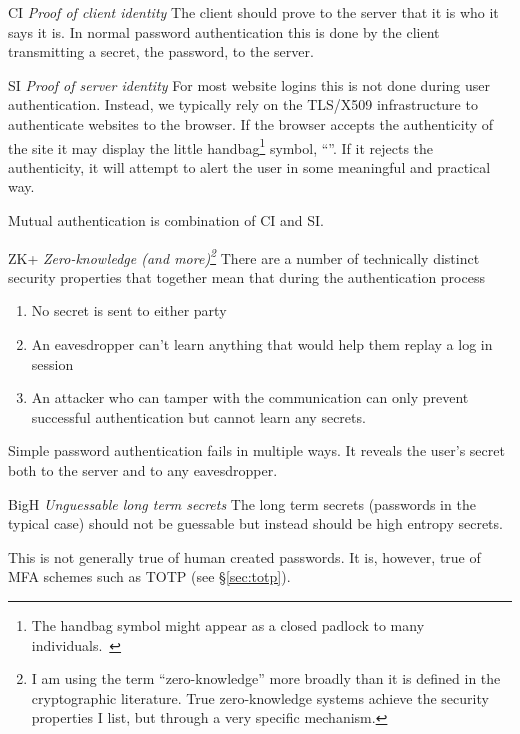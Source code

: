 \documentclass[12pt]{article}
\newcommand{\propdescription}[1]{\textit{#1}\hspace*{\fill}\linebreak }
\newcommand{\prop}[1]{\textsf{#1}}
\begin{document}
\begin{desiderata}
  \item[CI] \propdescription{Proof of client identity}
    The client should prove to the server that it is who it says it is.
    In normal password authentication this is done by the client transmitting a secret, the password, to the server.

  \item[SI] \propdescription{Proof of server identity}
    For most website logins this is not done during user authentication.
    Instead, we typically rely on the TLS/X509 infrastructure to authenticate websites to the browser. If the browser accepts the authenticity of the site it may display the little handbag\footnote{The handbag symbol might appear as a closed padlock to many individuals.~\cite{felt2016rethinking}} symbol, “{\color{padlockcolor}\small\faLock}”.
	  If it rejects the authenticity, it will attempt to alert the user in some meaningful and practical way.
	 
    Mutual authentication is combination of \prop{CI} and \prop{SI}.

  \item[ZK+] \propdescription{Zero-knowledge (and more)\footnote{I am using the term “zero-knowledge” more broadly than it is defined in the cryptographic literature. True zero-knowledge systems achieve the security properties I list, but through a very specific mechanism.}}
  There are a number of technically distinct security properties that together mean that during the authentication process
  \begin{enumerate}
	  \item No secret is sent to either party
	  \item An eavesdropper can't learn anything that would help them replay a log in session
	  \item An attacker who can tamper with the communication can only prevent successful authentication but cannot learn any secrets.
	  \end{enumerate}
  
  Simple password authentication fails in multiple ways. It reveals the user's secret both to the server and to any eavesdropper.
   
  
  \item[BigH] \propdescription{Unguessable long term secrets}
    The long term secrets (passwords in the typical case) should not be guessable
    but instead should be high entropy secrets.
	
	This is not generally true of human created passwords.
    It is, however, true of MFA schemes such as TOTP (see \S\ref{sec:totp}).


\end{desiderata}
\end{document}
